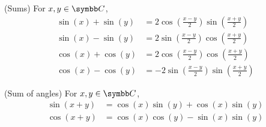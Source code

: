 \begin{proposition}
\begin{PropEnum}
     (Sums) For \( x, y \in \BC \),
    \begin{align}
      \sin(x) + \sin(y) & = 2 \cos\left(\frac{x - y} 2 \right) \sin\left(\frac{x + y} 2 \right) \label{thm:trigonometric_identities/sums/sin_sum}   \\
      \sin(x) - \sin(y) & = 2 \sin\left(\frac{x - y} 2 \right) \cos\left(\frac{x + y} 2 \right) \label{thm:trigonometric_identities/sums/sin_diff}  \\
      \cos(x) + \cos(y) & = 2 \cos\left(\frac{x - y} 2 \right) \cos\left(\frac{x + y} 2 \right) \label{thm:trigonometric_identities/sums/cos_sum}   \\
      \cos(x) - \cos(y) & = -2 \sin\left(\frac{x - y} 2 \right) \sin\left(\frac{x + y} 2 \right) \label{thm:trigonometric_identities/sums/cos_diff}
    \end{align}

     (Sum of angles) For \( x, y \in \BC \),
    \begin{align}
      \sin(x + y) & = \cos(x) \sin(y) + \cos(x) \sin(y) \label{thm:trigonometric_identities/products/sin} \\
      \cos(x + y) & = \cos(x) \cos(y) - \sin(x) \sin(y) \label{thm:trigonometric_identities/products/cos}
    \end{align}
  \end{PropEnum}
\end{proposition}
